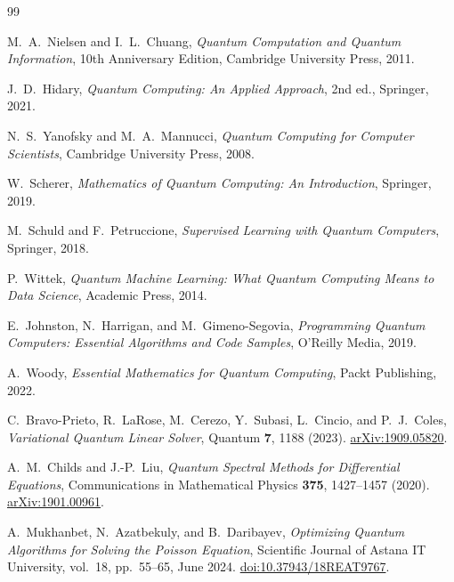 \documentclass[a4paper,12pt]{amsart}
\begin{document}
\begin{thebibliography}{99}

M.~A.~Nielsen and I.~L.~Chuang,
\textit{Quantum Computation and Quantum Information},
10th Anniversary Edition, Cambridge University Press, 2011.

J.~D.~Hidary,
\textit{Quantum Computing: An Applied Approach},
2nd ed., Springer, 2021.

N.~S.~Yanofsky and M.~A.~Mannucci,
\textit{Quantum Computing for Computer Scientists},
Cambridge University Press, 2008.

W.~Scherer,
\textit{Mathematics of Quantum Computing: An Introduction},
Springer, 2019.

M.~Schuld and F.~Petruccione,
\textit{Supervised Learning with Quantum Computers},
Springer, 2018.

P.~Wittek,
\textit{Quantum Machine Learning: What Quantum Computing Means to Data Science},
Academic Press, 2014.

E.~Johnston, N.~Harrigan, and M.~Gimeno-Segovia,
\textit{Programming Quantum Computers: Essential Algorithms and Code Samples},
O'Reilly Media, 2019.

A.~Woody,
\textit{Essential Mathematics for Quantum Computing},
Packt Publishing, 2022.

C.~Bravo-Prieto, R.~LaRose, M.~Cerezo, Y.~Subasi, L.~Cincio, and P.~J.~Coles,
\textit{Variational Quantum Linear Solver},
Quantum \textbf{7}, 1188 (2023).
\href{https://doi.org/10.48550/arXiv.1909.05820}{arXiv:1909.05820}.

A.~M.~Childs and J.-P.~Liu,
\textit{Quantum Spectral Methods for Differential Equations},
Communications in Mathematical Physics \textbf{375}, 1427--1457 (2020).
\href{https://doi.org/10.48550/arXiv.1901.00961}{arXiv:1901.00961}.

A.~Mukhanbet, N.~Azatbekuly, and B.~Daribayev,
\textit{Optimizing Quantum Algorithms for Solving the Poisson Equation},
Scientific Journal of Astana IT University, vol.~18, pp.~55--65, June 2024.
\href{https://doi.org/10.37943/18REAT9767}{doi:10.37943/18REAT9767}.



\end{thebibliography}
\end{document}
